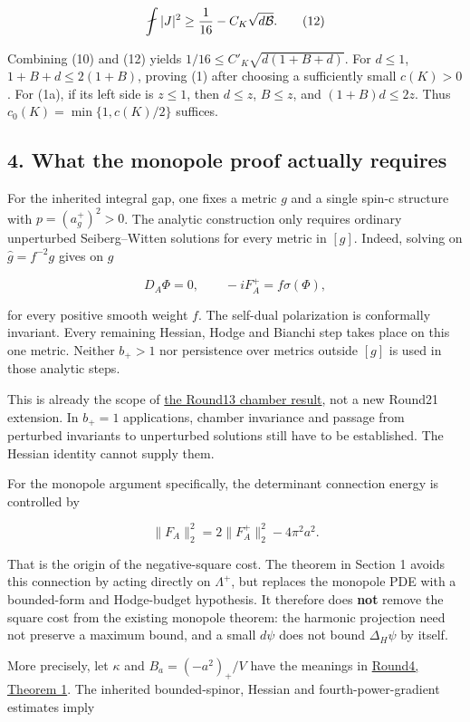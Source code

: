 \documentclass[
  10pt,
]{article}
\begin{document}
\[
           \fint|J|^2\ge {1\over16}-C_K\sqrt{d\mathcal B}.\tag{12}
\]

Combining (10) and (12) yields \(1/16\le C'_K\sqrt{d(1+B+d)}\). For
\(d\le1\), \(1+B+d\le2(1+B)\), proving (1) after choosing a sufficiently
small \(c(K)>0\). For (1a), if its left side is \(z\le1\), then
\(d\le z\), \(B\le z\), and \((1+B)d\le2z\). Thus
\(c_0(K)=\min\{1,c(K)/2\}\) suffices.

\hypertarget{what-the-monopole-proof-actually-requires}{%
\subsection{4. What the monopole proof actually
requires}\label{what-the-monopole-proof-actually-requires}}

For the inherited integral gap, one fixes a metric \(g\) and a single
spin-c structure with \(p=(a_g^+)^2>0\). The analytic construction only
requires ordinary unperturbed Seiberg--Witten solutions for every metric
in \([g]\). Indeed, solving on \(\widehat g=f^{-2}g\) gives on \(g\)

\[
 D_A\Phi=0,\qquad -iF_A^+=f\sigma(\Phi),
\]

for every positive smooth weight \(f\). The self-dual polarization is
conformally invariant. Every remaining Hessian, Hodge and Bianchi step
takes place on this one metric. Neither \(b_+>1\) nor persistence over
metrics outside \([g]\) is used in those analytic steps.

This is already the scope of \href{round13_chamber.md}{the Round13
chamber result}, not a new Round21 extension. In \(b_+=1\) applications,
chamber invariance and passage from perturbed invariants to unperturbed
solutions still have to be established. The Hessian identity cannot
supply them.

For the monopole argument specifically, the determinant connection
energy is controlled by

\[
 \|F_A\|_2^2=2\|F_A^+\|_2^2-4\pi^2a^2.
\]

That is the origin of the negative-square cost. The theorem in Section 1
avoids this connection by acting directly on \(\Lambda^+\), but replaces
the monopole PDE with a bounded-form and Hodge-budget hypothesis. It
therefore does \textbf{not} remove the square cost from the existing
monopole theorem: the harmonic projection need not preserve a maximum
bound, and a small \(d\psi\) does not bound \(\Delta_H\psi\) by itself.

More precisely, let \(\kappa\) and \(B_a=(-a^2)_+/V\) have the meanings
in \href{round4_rigidity.md}{Round4, Theorem 1}. The inherited
bounded-spinor, Hessian and fourth-power-gradient estimates imply
\end{document}
